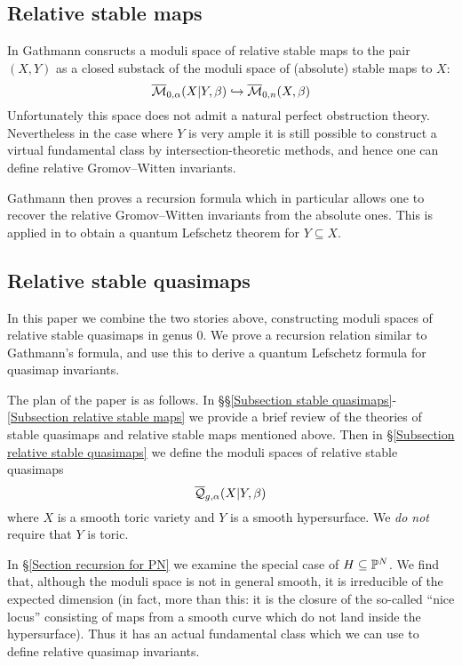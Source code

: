 \subsection{Relative stable maps}
In \cite{Ga} Gathmann consructs a moduli space of relative stable maps to the pair $(X,Y)$ as a closed substack of the moduli space of (absolute) stable maps to $X$:
\begin{equation*} \overline{\mathcal M}_{0,\alpha}(X|Y,\beta) \hookrightarrow \overline{\mathcal M}_{0,n}(X,\beta) \end{equation*}
Unfortunately this space does not admit a natural perfect obstruction theory. Nevertheless in the case where $Y$ is very ample it is still possible to construct a virtual fundamental class by intersection-theoretic methods, and hence one can define relative Gromov--Witten invariants.

Gathmann then proves a recursion formula which in particular allows one to recover the relative Gromov--Witten invariants from the absolute ones. This is  applied in \cite{Ga-MF} to obtain a quantum Lefschetz theorem for $Y \subseteq X$.

\subsection{Relative stable quasimaps}
In this paper we combine the two stories above, constructing moduli spaces of relative stable quasimaps in genus $0$. We prove a recursion relation similar to Gathmann's formula, and use this to derive a quantum Lefschetz formula for quasimap invariants.

The plan of the paper is as follows. In \S\S \ref{Subsection stable quasimaps}-\ref{Subsection relative stable maps} we provide a brief review of the theories of stable quasimaps and relative stable maps mentioned above. Then in \S \ref{Subsection relative stable quasimaps} we define the moduli spaces of relative stable quasimaps
\begin{equation*} \overline{\mathcal Q}_{g,\alpha}(X|Y,\beta) \end{equation*}
where $X$ is a smooth toric variety and $Y$ is a smooth hypersurface. We \emph{do not} require that $Y$ is toric.

In \S \ref{Section recursion for PN} we examine the special case of $H \subseteq \mathbb P^N$. We find that, although the moduli space is not in general smooth, it is irreducible of the expected dimension (in fact, more than this: it is the closure of the so-called ``nice locus'' consisting of maps from a smooth curve which do not land inside the hypersurface). Thus it has an actual fundamental class which we can use to define relative quasimap invariants.

